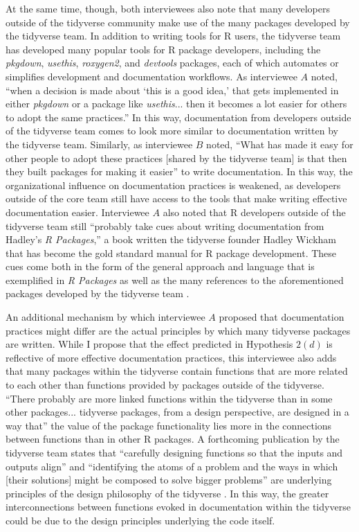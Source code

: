 At the same time, though, both interviewees also note that many developers outside of the tidyverse community make use of the many packages developed by the tidyverse team. In addition to writing tools for R users, the tidyverse team has developed many popular tools for R package developers, including the \textit{pkgdown}, \textit{usethis}, \textit{roxygen2}, and \textit{devtools} packages, each of which automates or simplifies development and documentation workflows. As interviewee $A$ noted, ``when a decision is made about ‘this is a good idea,’ that gets implemented in either \textit{pkgdown} or a package like \textit{usethis}... then it becomes a lot easier for others to adopt the same practices.'' In this way, documentation from developers outside of the tidyverse team comes to look more similar to documentation written by the tidyverse team. Similarly, as interviewee $B$ noted, ``What has made it easy for other people to adopt these practices [shared by the tidyverse team] is that then they built packages for making it easier'' to write documentation. In this way, the organizational influence on documentation practices is weakened, as developers outside of the core team still have access to the tools that make writing effective documentation easier. Interviewee $A$ also noted that R developers outside of the tidyverse team still ``probably take cues about writing documentation from Hadley’s \textit{R Packages},'' a book written the tidyverse founder Hadley Wickham that has become the gold standard manual for R package development. These cues come both in the form of the general approach and language that is exemplified in \textit{R Packages} as well as the many references to the aforementioned packages developed by the tidyverse team \cite{wickham2015r}.

An additional mechanism by which interviewee $A$ proposed that documentation practices might differ are the actual principles by which many tidyverse packages are written. While I propose that the effect predicted in Hypothesis $2(d)$ is reflective of more effective documentation practices, this interviewee also adds that many packages within the tidyverse contain functions that are more related to each other than functions provided by packages outside of the tidyverse. ``There probably are more linked functions within the tidyverse than in some other packages... tidyverse packages, from a design perspective, are designed in a way that'' the value of the package functionality lies more in the connections between functions than in other R packages. A forthcoming publication by the tidyverse team states that ``carefully designing functions so that the inputs and outputs align'' and ``identifying the atoms of a problem and the ways in which [their solutions] might be composed to solve bigger problems'' are underlying principles of the design philosophy of the tidyverse \cite{wickham2020tidyverse}. In this way, the greater interconnections between functions evoked in documentation within the tidyverse could be due to the design principles underlying the code itself.

